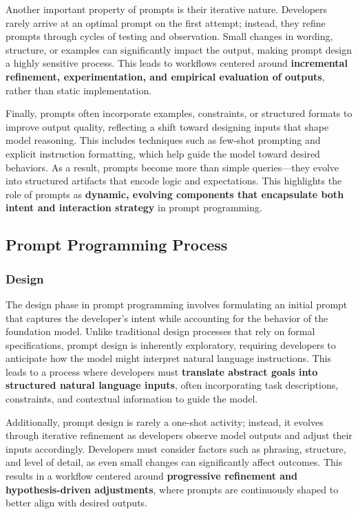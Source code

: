 Another important property of prompts is their iterative nature. Developers rarely arrive at an optimal prompt on the first attempt; instead, they refine prompts through cycles of testing and observation. Small changes in wording, structure, or examples can significantly impact the output, making prompt design a highly sensitive process. This leads to workflows centered around \textbf{incremental refinement, experimentation, and empirical evaluation of outputs}, rather than static implementation.

Finally, prompts often incorporate examples, constraints, or structured formats to improve output quality, reflecting a shift toward designing inputs that shape model reasoning. This includes techniques such as few-shot prompting and explicit instruction formatting, which help guide the model toward desired behaviors. As a result, prompts become more than simple queries—they evolve into structured artifacts that encode logic and expectations. This highlights the role of prompts as \textbf{dynamic, evolving components that encapsulate both intent and interaction strategy} in prompt programming.

\subsection{Prompt Programming Process}
\subsubsection{Design}
The design phase in prompt programming involves formulating an initial prompt that captures the developer’s intent while accounting for the behavior of the foundation model. Unlike traditional design processes that rely on formal specifications, prompt design is inherently exploratory, requiring developers to anticipate how the model might interpret natural language instructions. This leads to a process where developers must \textbf{translate abstract goals into structured natural language inputs}, often incorporating task descriptions, constraints, and contextual information to guide the model.

Additionally, prompt design is rarely a one-shot activity; instead, it evolves through iterative refinement as developers observe model outputs and adjust their inputs accordingly. Developers must consider factors such as phrasing, structure, and level of detail, as even small changes can significantly affect outcomes. This results in a workflow centered around \textbf{progressive refinement and hypothesis-driven adjustments}, where prompts are continuously shaped to better align with desired outputs.

